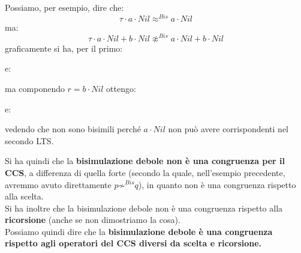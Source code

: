 \begin{esempio}
  Possiamo, per esempio, dire che:
  \[\tau\cdot a\cdot Nil\approx^{Bis}a\cdot Nil\]
  ma:
  \[\tau\cdot a\cdot Nil+b\cdot Nil\not\approx^{Bis}a\cdot Nil+b\cdot Nil\]
  graficamente si ha, per il primo:
  \begin{center}
  \end{center}
  e:
  \begin{center}
  \end{center}
  ma componendo $r=b\cdot Nil$ ottengo:
  \begin{center}
  \end{center}
  e:
  \begin{center}
  \end{center}
  vedendo che non sono bisimili perché $a\cdot Nil$ non può avere corrispondenti
  nel secondo LTS.
\end{esempio}
Si ha quindi che la \textbf{bisimulazione debole non è una congruenza per il
  CCS}, a differenza di quella forte (secondo la quale, nell'esempio precedente,
avremmo avuto direttamente $p\not\sim^{Bis}q$), in quanto non è una congruenza
rispetto alla scelta.\\
Si ha inoltre che la bisimulazione debole non è una congruenza rispetto alla
\textbf{ricorsione} (anche se non dimostriamo la cosa).\\
Possiamo quindi dire che la \textbf{bisimulazione debole è una congruenza
  rispetto agli operatori del CCS diversi da scelta e ricorsione.}\\

